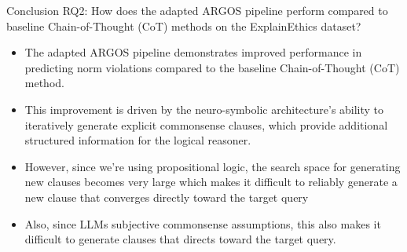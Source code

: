 \documentclass{beamer}
\begin{document}
    \begin{frame}{Conclusion}   
        RQ2: How does the adapted ARGOS pipeline perform compared to baseline Chain-of-Thought (CoT) methods on the ExplainEthics dataset?
        \begin{itemize}
            \item The adapted ARGOS pipeline demonstrates improved performance in predicting norm violations compared to the baseline Chain-of-Thought (CoT) method.
            \item This improvement is driven by the neuro-symbolic architecture’s ability to iteratively generate explicit commonsense clauses, which provide additional structured information for the logical reasoner.
            \item However, since we're using propositional logic, the search space for generating new clauses becomes very large which makes it difficult to reliably generate a new clause that converges directly toward the target query
            \item Also, since LLMs subjective commonsense assumptions, this also makes it difficult to generate clauses that directs toward the target query.
        \end{itemize}
    \end{frame}

    \QApage
\end{document}
